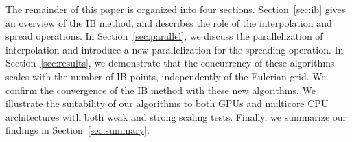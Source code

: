 The remainder of this paper is organized into four sections. Section~\ref{sec:ib} gives
an overview of the IB method, and describes the role of the interpolation and spread
operations. In Section~\ref{sec:parallel}, we discuss the parallelization of
interpolation and introduce a new parallelization for the spreading operation. In
Section~\ref{sec:results}, we demonstrate that the concurrency of these algorithms scales
with the number of IB points, independently of the Eulerian grid. We confirm the
convergence of the IB method with these new algorithms. We illustrate the suitability of
our algorithms to both GPUs and multicore CPU architectures with both weak and strong
scaling tests. Finally, we summarize our findings in Section~\ref{sec:summary}.

